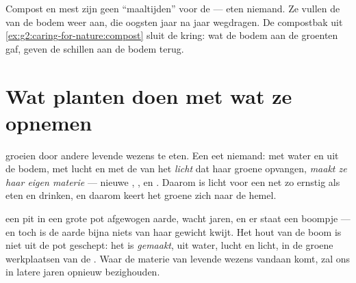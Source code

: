 \begin{remark}\label{rem:g4:what-plants-need:soil}
Compost en mest zijn geen ``maaltijden'' voor de  ---  eten
niemand. Ze vullen de  van de bodem weer aan, die
oogsten jaar na jaar wegdragen. De compostbak uit
\cref{ex:g2:caring-for-nature:compost} sluit de kring: wat de bodem aan
de groenten gaf, geven de schillen aan de bodem terug.
\end{remark}

\section{Wat planten doen met wat ze opnemen}

\begin{proposition}\label{prop:g4:what-plants-need:make}
 groeien door andere levende wezens te eten. Een  eet
niemand: met water en  uit de bodem, met lucht en met de
 van het \emph{licht} dat haar groene  opvangen,
\emph{maakt ze haar eigen materie} --- nieuwe , ,
 en . Daarom is licht voor een  net zo ernstig als eten
en drinken, en daarom keert het groene  zich naar de hemel.
\end{proposition}
\admitted

\begin{example}\label{ex:g4:what-plants-need:tree}
 een pit in een grote pot afgewogen aarde, wacht jaren, en er
staat een boompje --- en toch is de aarde bijna niets van haar gewicht
kwijt. Het hout van de boom is niet uit de pot geschept: het is
\emph{gemaakt}, uit water, lucht en licht, in de groene werkplaatsen
van de . Waar de materie van levende wezens vandaan komt, zal
ons in latere jaren opnieuw bezighouden.
\end{example}

